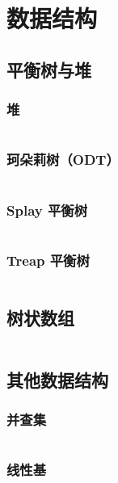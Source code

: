 \chapter{数据结构}

\section{平衡树与堆}

\subsection{堆}

\inputminted{cpp}{code/DateStructure/BBSTAndHeap/Heap.cpp}

\subsection{珂朵莉树（ODT）}

\inputminted{cpp}{code/DateStructure/BBSTAndHeap/ODT.cpp}

\subsection{Splay 平衡树}

\inputminted{cpp}{code/DateStructure/BBSTAndHeap/Splay.cpp}

\subsection{Treap 平衡树}

\inputminted{cpp}{code/DateStructure/BBSTAndHeap/Treap.cpp}

\section{树状数组}

\inputminted{cpp}{code/DateStructure/BIT/BIT.cpp}

\section{其他数据结构}

\subsection{并查集}

\inputminted{cpp}{code/DateStructure/Other/DSU.cpp}

\subsection{线性基}


